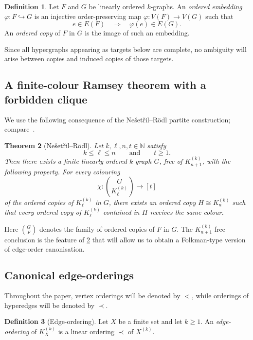 \documentclass[11pt]{amsart}
\newtheorem{theorem}{Theorem}[section]
\theoremstyle{definition}
\newtheorem{definition}[theorem]{Definition}
\newcommand{\N}{\mathbb{N}}
\begin{document}
\begin{definition}
Let $F$ and $G$ be linearly ordered $k$-graphs. An \emph{ordered embedding} $\varphi:F\hookrightarrow G$ is an injective order-preserving map $\varphi:V(F)\to V(G)$ such that
\[
e\in E(F)\quad\Longrightarrow\quad \varphi(e)\in E(G).
\]
An \emph{ordered copy} of $F$ in $G$ is the image of such an embedding.
\end{definition}

Since all hypergraphs appearing as targets below are complete, no ambiguity will arise between copies and induced copies of those targets.

\subsection{A finite-colour Ramsey theorem with a forbidden clique}

We use the following consequence of the Ne\v{s}et\v{r}il--R\"odl partite construction; compare~\cite{NR1989}.

\begin{theorem}[Ne\v{s}et\v{r}il--R\"odl]\label{thm:NR}
Let $k,\ell,n,t\in\N$ satisfy
\[
k\le \ell\le n
\qquad\text{and}\qquad
t\ge 1.
\]
Then there exists a finite linearly ordered $k$-graph $G$, free of $K_{n+1}^{(k)}$, with the following property. For every colouring
\[
\chi:\binom{G}{K_{\ell}^{(k)}}\longrightarrow[t]
\]
of the ordered copies of $K_{\ell}^{(k)}$ in $G$, there exists an ordered copy $H\cong K_n^{(k)}$ such that every ordered copy of $K_{\ell}^{(k)}$ contained in $H$ receives the same colour.
\end{theorem}

Here $\binom{G}{F}$ denotes the family of ordered copies of $F$ in $G$. The $K_{n+1}^{(k)}$-free conclusion is the feature of \cref{thm:NR} that will allow us to obtain a Folkman-type version of edge-order canonisation.

\subsection{Canonical edge-orderings}

Throughout the paper, vertex orderings will be denoted by $<$, while orderings of hyperedges will be denoted by $\prec$.

\begin{definition}[Edge-ordering]
Let $X$ be a finite set and let $k\ge 1$. An \emph{edge-ordering} of $K_X^{(k)}$ is a linear ordering $\prec$ of $X^{(k)}$.
\end{definition}
\end{document}
